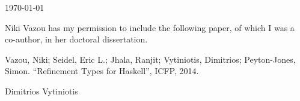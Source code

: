 \documentclass{article}
\begin{document}
\today

Niki Vazou has my permission to include the following paper, of which
I was a co-author, in her doctoral dissertation.

Vazou, Niki; Seidel, Eric L.; Jhala, Ranjit; Vytiniotis, Dimitrios; Peyton-Jones, Simon.
``Refinement Types for Haskell'', ICFP, 2014.

\baselineskip
Dimitrios Vytiniotis
\end{document}
